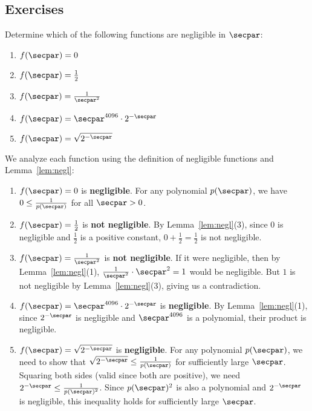 \subsection{Exercises}

\begin{exercise}\label{ex:negligible-functions}
  Determine which of the following functions are negligible in $\secpar$:
  \begin{enumerate}
    \item $f(\secpar) = 0$
    \item $f(\secpar) = \frac{1}{2}$
    \item $f(\secpar) = \frac{1}{\secpar^2}$
    \item $f(\secpar) = \secpar^{4096} \cdot 2^{-\secpar}$
    \item $f(\secpar) = \sqrt{2^{-\secpar}}$
  \end{enumerate}
\end{exercise}

\ifsolutions
\begin{mysolution}
  We analyze each function using the definition of negligible functions and Lemma~\ref{lem:negl}:
  \begin{enumerate}
    \item $f(\secpar) = 0$ is \textbf{negligible}.
    For any polynomial $p(\secpar)$, we have $0 \le \frac{1}{p(\secpar)}$ for all $\secpar > 0$.
    
    \item $f(\secpar) = \frac{1}{2}$ is \textbf{not negligible}.
    By Lemma~\ref{lem:negl}(3), since $0$ is negligible and $\frac{1}{2}$ is a positive constant, $0 + \frac{1}{2} = \frac{1}{2}$ is not negligible.
    
    \item $f(\secpar) = \frac{1}{\secpar^2}$ is \textbf{not negligible}.
    If it were negligible, then by Lemma~\ref{lem:negl}(1), $\frac{1}{\secpar^2} \cdot \secpar^2 = 1$ would be negligible.
    But $1$ is not negligible by Lemma~\ref{lem:negl}(3), giving us a contradiction.
    
    \item $f(\secpar) = \secpar^{4096} \cdot 2^{-\secpar}$ is \textbf{negligible}.
    By Lemma~\ref{lem:negl}(1), since $2^{-\secpar}$ is negligible and $\secpar^{4096}$ is a polynomial, their product is negligible.
    
    \item $f(\secpar) = \sqrt{2^{-\secpar}}$ is \textbf{negligible}.
    For any polynomial $p(\secpar)$, we need to show that $\sqrt{2^{-\secpar}} \le \frac{1}{p(\secpar)}$ for sufficiently large $\secpar$.
    Squaring both sides (valid since both are positive), we need $2^{-\secpar} \le \frac{1}{p(\secpar)^2}$.
    Since $p(\secpar)^2$ is also a polynomial and $2^{-\secpar}$ is negligible, this inequality holds for sufficiently large $\secpar$.
  \end{enumerate}
\end{mysolution}
\fi

